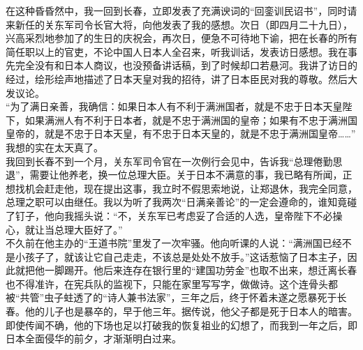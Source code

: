 在这种昏昏然中，我一回到长春，立即发表了充满谀词的“回銮训民诏书”，同时请来新任的关东军司令长官大将，向他发表了我的感想。次日（即四月二十九日），兴高采烈地参加了的生日的庆祝会，再次日，便急不可待地下谕，把在长春的所有简任职以上的官吏，不论中国人日本人全召来，听我训话，发表访日感想。我在事先完全没有和日本人商议，也没预备讲话稿，到了时候却口若悬河。我讲了访日的经过，绘形绘声地描述了日本天皇对我的招待，讲了日本臣民对我的尊敬。然后大发议论。\\

“为了满日亲善，我确信：如果日本人有不利于满洲国者，就是不忠于日本天皇陛下，如果满洲人有不利于日本者，就是不忠于满洲国的皇帝；如果有不忠于满洲国皇帝的，就是不忠于日本天皇，有不忠于日本天皇的，就是不忠于满洲国皇帝……”\\

我想的实在太天真了。\\

我回到长春不到一个月，关东军司令官在一次例行会见中，告诉我“总理倦勤思退”，需要让他养老，换一位总理大臣。关于日本不满意的事，我已略有所闻，正想找机会赶走他，现在提出这事，我立时不假思索地说，让郑退休，我完全同意，总理之职可以由继任。我以为听了我两次“日满亲善论”的一定会遵命的，谁知竟碰了钉子，他向我摇头说：“不，关东军已考虑妥了合适的人选，皇帝陛下不必操心，就让当总理大臣好了。”\\

不久前在他主办的“王道书院”里发了一次牢骚。他向听课的人说：“满洲国已经不是小孩子了，就该让它自己走走，不该总是处处不放手。”这话惹恼了日本主子，因此就把他一脚踢开。他后来连存在银行里的“建国功劳金”也取不出来，想迁离长春也不得准许，在宪兵队的监视下，只能在家里写写字，做做诗。这个连骨头都被“共管”虫子蛀透了的“诗人兼书法家”，三年之后，终于怀着未遂之愿暴死于长春。他的儿子也是暴卒的，早于他三年。据传说，他父子都是死于日本人的暗害。即使传闻不确，他的下场也足以打破我的恢复祖业的幻想了，而我到一年之后，即日本全面侵华的前夕，才渐渐明白过来。
